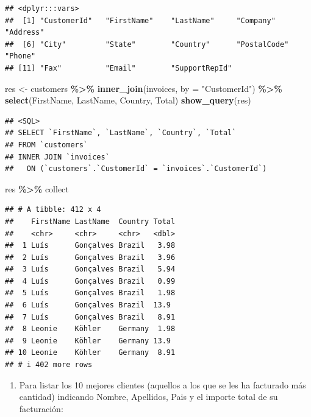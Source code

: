 \documentclass[
]{book}
\newenvironment{Shaded}{\begin{snugshade}}{\end{snugshade}}
\newcommand{\AttributeTok}[1]{\textcolor[rgb]{0.13,0.29,0.53}{#1}}
\newcommand{\FunctionTok}[1]{\textcolor[rgb]{0.13,0.29,0.53}{\textbf{#1}}}
\newcommand{\NormalTok}[1]{#1}
\newcommand{\OtherTok}[1]{\textcolor[rgb]{0.56,0.35,0.01}{#1}}
\newcommand{\SpecialCharTok}[1]{\textcolor[rgb]{0.81,0.36,0.00}{\textbf{#1}}}
\newcommand{\StringTok}[1]{\textcolor[rgb]{0.31,0.60,0.02}{#1}}
\providecommand{\tightlist}{%
  \setlength{\itemsep}{0pt}\setlength{\parskip}{0pt}}
\theoremstyle{break}
\theoremstyle{nonumberplain}
\begin{document}
\begin{verbatim}
## <dplyr:::vars>
##  [1] "CustomerId"   "FirstName"    "LastName"     "Company"      "Address"     
##  [6] "City"         "State"        "Country"      "PostalCode"   "Phone"       
## [11] "Fax"          "Email"        "SupportRepId"
\end{verbatim}

\begin{Shaded}
\begin{Highlighting}[]
\NormalTok{res }\OtherTok{\textless{}{-}}\NormalTok{ customers }\SpecialCharTok{\%\textgreater{}\%} 
  \FunctionTok{inner\_join}\NormalTok{(invoices, }\AttributeTok{by =} \StringTok{"CustomerId"}\NormalTok{) }\SpecialCharTok{\%\textgreater{}\%} 
  \FunctionTok{select}\NormalTok{(FirstName, LastName, Country, Total) }
\FunctionTok{show\_query}\NormalTok{(res)}
\end{Highlighting}
\end{Shaded}

\begin{verbatim}
## <SQL>
## SELECT `FirstName`, `LastName`, `Country`, `Total`
## FROM `customers`
## INNER JOIN `invoices`
##   ON (`customers`.`CustomerId` = `invoices`.`CustomerId`)
\end{verbatim}

\begin{Shaded}
\begin{Highlighting}[]
\NormalTok{res  }\SpecialCharTok{\%\textgreater{}\%}\NormalTok{ collect}
\end{Highlighting}
\end{Shaded}

\begin{verbatim}
## # A tibble: 412 x 4
##    FirstName LastName  Country Total
##    <chr>     <chr>     <chr>   <dbl>
##  1 Luís      Gonçalves Brazil   3.98
##  2 Luís      Gonçalves Brazil   3.96
##  3 Luís      Gonçalves Brazil   5.94
##  4 Luís      Gonçalves Brazil   0.99
##  5 Luís      Gonçalves Brazil   1.98
##  6 Luís      Gonçalves Brazil  13.9 
##  7 Luís      Gonçalves Brazil   8.91
##  8 Leonie    Köhler    Germany  1.98
##  9 Leonie    Köhler    Germany 13.9 
## 10 Leonie    Köhler    Germany  8.91
## # i 402 more rows
\end{verbatim}

\begin{enumerate}
\def\labelenumi{\arabic{enumi}.}
\setcounter{enumi}{4}
\tightlist
\item
  Para listar los 10 mejores clientes (aquellos a los que se les ha facturado más cantidad) indicando Nombre, Apellidos, Pais y el importe total de su facturación:
\end{enumerate}
\end{document}
